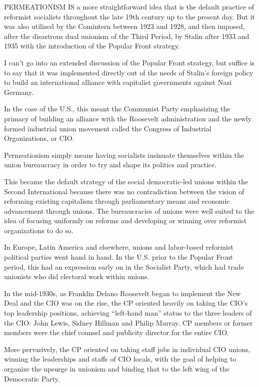 PERMEATIONISM IS a more straightforward idea that is the default practice of reformist socialists throughout the late 19th century up to the present day. But it was also utilized by the Comintern between 1923 and 1928, and then imposed, after the disastrous dual unionism of the Third Period, by Stalin after 1933 and 1935 with the introduction of the Popular Front strategy.

I can’t go into an extended discussion of the Popular Front strategy, but suffice is to say that it was implemented directly out of the needs of Stalin’s foreign policy to build an international alliance with capitalist governments against Nazi Germany.

In the case of the U.S., this meant the Communist Party emphasizing the primacy of building an alliance with the Roosevelt administration and the newly formed industrial union movement called the Congress of Industrial Organizations, or CIO.

Permeationism simply means having socialists insinuate themselves within the union bureaucracy in order to try and shape its politics and practice.

This became the default strategy of the social democratic-led unions within the Second International because there was no contradiction between the vision of reforming existing capitalism through parliamentary means and economic advancement through unions. The bureaucracies of unions were well suited to the idea of focusing uniformly on reforms and developing or winning over reformist organizations to do so.

In Europe, Latin America and elsewhere, unions and labor-based reformist political parties went hand in hand. In the U.S. prior to the Popular Front period, this had an expression early on in the Socialist Party, which had trade unionists who did electoral work within unions.

In the mid-1930s, as Franklin Delano Roosevelt began to implement the New Deal and the CIO was on the rise, the CP oriented heavily on taking the CIO’s top leadership positions, achieving “left-hand man” status to the three leaders of the CIO: John Lewis, Sidney Hillman and Philip Murray. CP members or former members were the chief counsel and publicity director for the entire CIO.

More pervasively, the CP oriented on taking staff jobs in individual CIO unions, winning the leaderships and staffs of CIO locals, with the goal of helping to organize the upsurge in unionism and binding that to the left wing of the Democratic Party.

